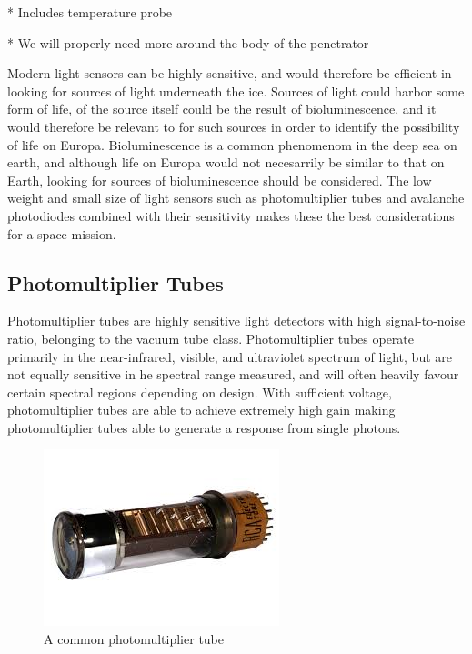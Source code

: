 * Includes temperature probe

    * We will properly need more around the body of the penetrator


Modern light sensors can be highly sensitive, and would therefore be efficient in looking for sources of light underneath the ice. Sources of light could harbor some form of life, of the source itself could be the result of bioluminescence, and it would therefore be relevant to for such sources in order to identify the possibility of life on Europa. Bioluminescence is a common phenomenom in the deep sea on earth, and although life on Europa would not necesarrily be similar to that on Earth, looking for sources of bioluminescence should be considered. The low weight and small size of light sensors such as photomultiplier tubes and avalanche photodiodes combined with their sensitivity makes these the best considerations for a space mission. 

\subsection{Photomultiplier Tubes}

Photomultiplier tubes are highly sensitive light detectors with high signal-to-noise ratio, belonging to the vacuum tube class. Photomultiplier tubes operate primarily in the near-infrared, visible, and ultraviolet spectrum of light, but are not equally sensitive in he spectral range measured, and will often heavily favour certain spectral regions depending on design. With sufficient voltage, photomultiplier tubes are able to achieve extremely high gain making photomultiplier tubes able to generate a response from single photons.

\begin{figure}[htb]
\begin{center}
\includegraphics[scale=0.6]{figures/RCS/photomultiplier_tube}
\caption{A common photomultiplier tube}
\label{fig:PMT}
\end{center}
\end{figure}

